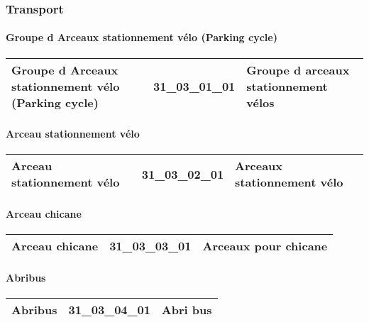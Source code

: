 \documentclass[12pt,titlepage,oneside]{book}
\begin{document}
\subsubsection{\large Transport}
\paragraph{Groupe d Arceaux stationnement vélo (Parking cycle)}
\noindent
\vspace{\baselineskip}

\renewcommand{\arraystretch}{1.2}
\begin{supertabular}{|p{10cm}|c|p{15cm}|}
 Groupe d Arceaux stationnement vélo (Parking cycle) & 31\_03\_01\_01 & Groupe d arceaux stationnement vélos\\
\hline
\end{supertabular}


\paragraph{Arceau stationnement vélo}
\noindent
\vspace{\baselineskip}

\renewcommand{\arraystretch}{1.2}
\begin{supertabular}{|p{10cm}|c|p{15cm}|}
 Arceau stationnement vélo & 31\_03\_02\_01 & Arceaux stationnement vélo\\
\hline
\end{supertabular}


\paragraph{Arceau chicane}
\noindent
\vspace{\baselineskip}

\renewcommand{\arraystretch}{1.2}
\begin{supertabular}{|p{10cm}|c|p{15cm}|}
 Arceau chicane & 31\_03\_03\_01 & Arceaux pour chicane\\
\hline
\end{supertabular}


\paragraph{Abribus}
\noindent
\vspace{\baselineskip}

\renewcommand{\arraystretch}{1.2}
\begin{supertabular}{|p{10cm}|c|p{15cm}|}
 Abribus & 31\_03\_04\_01 & Abri bus\\
\hline
\end{supertabular}
\end{document}
